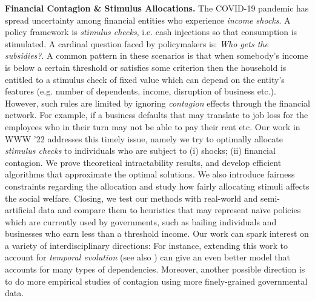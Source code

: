 \documentclass[11pt]{article}
\begin{document}
\noindent \textbf{Financial Contagion \& Stimulus Allocations.} The COVID-19 pandemic has spread uncertainty among financial entities who experience \emph{income shocks}. A policy framework is \emph{stimulus checks}, i.e. cash injections so that consumption is stimulated. A cardinal question faced by policymakers is: \emph{Who gets the subsidies?}. 
A common pattern in these scenarios is that when somebody's income is below a certain threshold or satisfies some criterion then the household is entitled to a stimulus check of fixed value which can depend on the entity's features (e.g. number of dependents, income, disruption of business etc.). However, such rules are limited by ignoring \emph{contagion} effects through the financial network. For example, if a business defaults that may translate to job loss for the employees who in their turn may not be able to pay their rent etc. Our work in WWW '22 \cite{papachristou2021allocating} addresses this timely issue, namely we try to optimally allocate \emph{stimulus checks} to individuals who are subject to (i) shocks; (ii) financial contagion. We prove theoretical intractability results, and develop efficient algorithms that approximate the  optimal solutions. We also introduce fairness constraints regarding the allocation and study how fairly allocating stimuli affects the social welfare. 
Closing, we test our methods with real-world and semi-artificial data and compare them to heuristics that may represent na\"ive policies which are currently used by governments, such as bailing individuals and businesses who earn less than a threshold income.
Our work can spark interest on a variety of interdisciplinary directions: For instance, extending this work to account for \emph{temporal evolution} (see also \cite{abebe2020subsidy}) can give an even better model that accounts for many types of dependencies.
Moreover, another possible direction is to do more empirical studies of contagion using more finely-grained governmental data.
\end{document}
